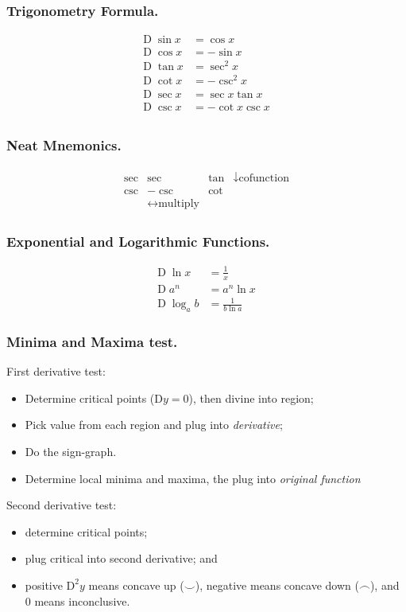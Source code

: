 \documentclass[../main.tex]{subfiles}
\begin{document}
\subsubsection*{Trigonometry Formula.}
\begin{align*}
    \mathrm{D}\; \sin x&= \cos x\\
    \mathrm{D}\; \cos x&= -\sin x\\
    \mathrm{D}\; \tan x&= \sec^2 x\\
    \mathrm{D}\; \cot x&= -\csc^2 x\\
    \mathrm{D}\; \sec x&= \sec x\tan x\\
    \mathrm{D}\; \csc x&= -\cot x\csc x\\
\end{align*}

\subsubsection*{Neat Mnemonics.}
\begin{align*}
\begin{matrix}
    \sec&\sec&\tan&\downarrow \textrm{cofunction}\\
    \csc&-\csc&\cot&\\
    &\leftrightarrow\textrm{multiply}
\end{matrix}
\end{align*}

\subsubsection*{Exponential and Logarithmic Functions.}
\begin{align*}
    \mathrm{D}\; \ln x &= \frac{1}{x}\\
    \mathrm{D}\; a^n&=a^n\ln x\\
    \mathrm{D}\; \log_a b&=\frac{1}{b\ln a}
\end{align*}

\subsubsection*{Minima and Maxima test.} First derivative test:
\begin{itemize}
    \item Determine critical points ($\mathrm{D}y=0$), then divine into region;
    \item Pick value from each region and plug into \emph{derivative};
    \item Do the sign-graph.
    \item Determine local minima and maxima, the plug into \emph{original function}
\end{itemize}
Second derivative test:
\begin{itemize}
    \item determine critical points;
    \item plug critical into second derivative; and
    \item positive $\mathrm{D}^2y$ means concave up ($\smile$), negative means concave down ($\frown$), and 0 means inconclusive.
\end{itemize}
\end{document}

